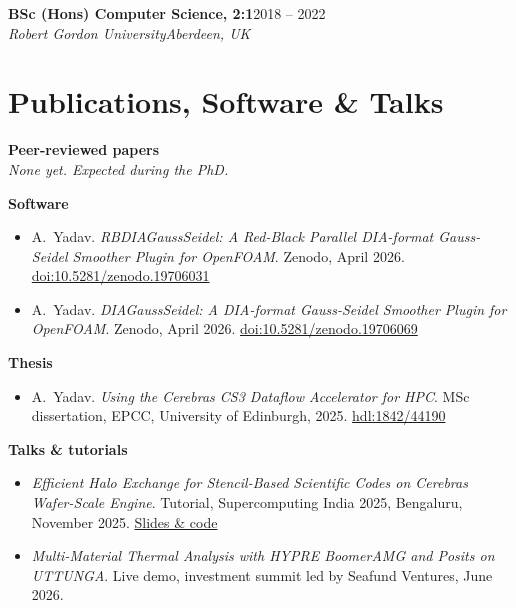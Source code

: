 \documentclass[10pt,a4paper]{article}
\newcommand{\entry}[4]{%
  \textbf{#1}\hfill #2\\
  \textit{#3}\hfill \textit{#4}\par\vspace{2pt}}
\begin{document}
\entry{BSc (Hons) Computer Science, 2:1}{2018 -- 2022}
      {Robert Gordon University}{Aberdeen, UK}

\section*{Publications, Software \& Talks}

\textbf{Peer-reviewed papers}\\
\textit{None yet. Expected during the PhD.}

\vspace{4pt}
\textbf{Software}
\begin{itemize}
  \item A.~Yadav. \textit{RBDIAGaussSeidel: A Red-Black Parallel DIA-format Gauss-Seidel Smoother Plugin for OpenFOAM}.
        Zenodo, April 2026. \href{https://doi.org/10.5281/zenodo.19706031}{doi:10.5281/zenodo.19706031}
  \item A.~Yadav. \textit{DIAGaussSeidel: A DIA-format Gauss-Seidel Smoother Plugin for OpenFOAM}.
        Zenodo, April 2026. \href{https://doi.org/10.5281/zenodo.19706069}{doi:10.5281/zenodo.19706069}
\end{itemize}

\textbf{Thesis}
\begin{itemize}
  \item A.~Yadav. \textit{Using the Cerebras CS3 Dataflow Accelerator for HPC}. MSc dissertation,
        EPCC, University of Edinburgh, 2025. \href{https://hdl.handle.net/1842/44190}{hdl:1842/44190}
\end{itemize}

\textbf{Talks \& tutorials}
\begin{itemize}
  \item \textit{Efficient Halo Exchange for Stencil-Based Scientific Codes on Cerebras Wafer-Scale Engine}.
        Tutorial, Supercomputing India 2025, Bengaluru, November 2025.
        \href{https://github.com/amartyadav/SCI2025_CerebrasWSE_HaloEx}{Slides \& code}
  \item \textit{Multi-Material Thermal Analysis with HYPRE BoomerAMG and Posits on UTTUNGA}.
        Live demo, investment summit led by Seafund Ventures, June 2026.
\end{itemize}

\end{document}
